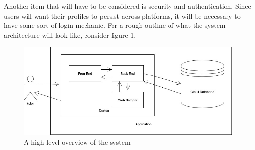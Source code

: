 Another item that will have to be considered is security and authentication.  Since users will want their profiles to persist across platforms, it will be necessary to have some sort of login mechanic.  
For a rough outline of what the system architecture will look like, consider figure 1.
\begin{figure}[h!]
    \centering
    \includegraphics{images/system diagram.jpg}
    \caption{A high level overview of the system}
\end{figure}


